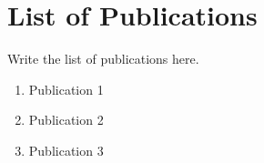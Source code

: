 
\chapter{List of Publications}\label{chapter:List of Publications}
Write the list of publications here.

	\begin{enumerate}
    	\item Publication 1
	
    	\item Publication 2

    	\item Publication 3
  	\end{enumerate}
